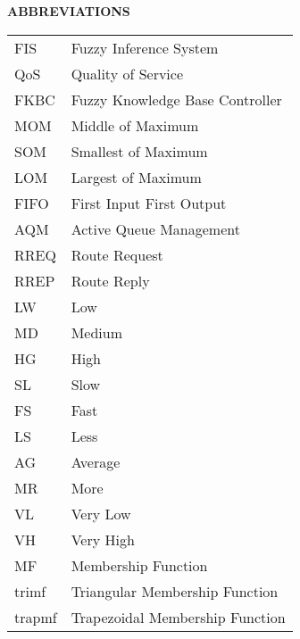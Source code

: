 \begin{center}
{\large\bf ABBREVIATIONS}
\end{center}
\begin{table}[h!]
\begin{tabular}{p{2cm}p{8cm}}
FIS & Fuzzy Inference System \\
QoS & Quality of Service \\
FKBC & Fuzzy Knowledge Base Controller \\
MOM & Middle of Maximum \\
SOM & Smallest of Maximum \\
LOM & Largest of Maximum \\
FIFO & First Input First Output \\
AQM & Active Queue Management \\
RREQ & Route Request \\
RREP & Route Reply \\
LW & Low \\
MD & Medium \\
HG & High \\
SL & Slow \\
FS & Fast \\
LS & Less \\
AG & Average \\
MR & More \\
VL & Very Low \\
VH & Very High \\
MF & Membership Function \\
trimf & Triangular Membership Function \\
trapmf & Trapezoidal Membership Function \\
\end{tabular}
\end{table}
